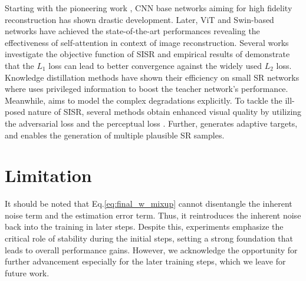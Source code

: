 \documentclass[letterpaper]{article} %
\begin{document}
Starting with the pioneering work \cite{SISR1_SRCNN}, CNN base networks \cite{SISR5_SAN, SISR12_HAN, SISR2_EDSR, SISR3_VDSR, SISR4_RCAN, SISR11_CRAN} aiming for high fidelity reconstruction has shown drastic development.
%
Later, ViT and Swin-based networks \cite{chen2021pre_transformer1, liang2021swinir, zhang2022swinfir, chen2023hat} have achieved the state-of-the-art performances revealing the effectiveness of self-attention in context of image reconstruction.
%
Several works investigate the objective function of SISR \cite{he2022revisiting_illposed_2, ning2021uncertainty} and empirical results of \cite{SISR2_EDSR} demonstrate that the $L_1$ loss can lead to better convergence against the widely used $L_2$ loss.
%
Knowledge distillation methods \cite{zhang2021data_distillation1, wang2021towards_distillation2, lee2020learning_distillation3, gao2019image_distillation4} have shown their efficiency on small SR networks where \cite{lee2020learning_distillation3} uses privileged information to boost the teacher network's performance.
%
Meanwhile, \cite{lew2021pixel, ikc, kernelgan} aims to model the complex degradations explicitly.
%
%
%
To tackle the ill-posed nature of SISR, several methods \cite{SISR6_SRGAN, SISR7_ESRGAN, SISR8_RankSRGAN} obtain enhanced visual quality by utilizing the adversarial loss and the perceptual loss \cite{perceptual_loss_vgg}. Further, \cite{jo2021tackling_illposed_1} generates adaptive targets, and \cite{hyun2020varsr, SISR9_SRFlow} enables the generation of multiple plausible SR samples.
%


%
%
%
%
%
%



\section{Limitation}
It should be noted that Eq.\eqref{eq:final_w_mixup} cannot disentangle the inherent noise term and the estimation error term. Thus, it reintroduces the inherent noise back into the training in later steps. Despite this, experiments emphasize the critical role of stability during the initial steps, setting a strong foundation that leads to overall performance gains. However, we acknowledge the opportunity for further advancement especially for the later training steps, which we leave for future work.
\end{document}
